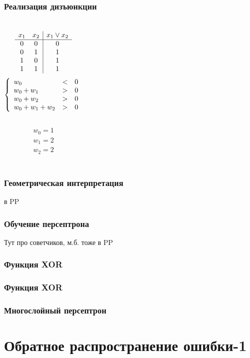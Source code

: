 \documentclass[24pt,pdf,hyperref={unicode}]{beamer}
\begin{document}
\begin{frame}\frametitle{Реализация дизъюнкции}
\begin{columns}
$$
\begin{array}{c c | c}
x_1 & x_2 & x_1\vee x_2 \\
\hline
0 & 0 & 0 \\
0 & 1 & 1 \\
1 & 0 & 1 \\
1 & 1 & 1 \\
\end{array}
$$
$$
\left\{
\begin{array}{l l l l l l}
 w_0       & < & 0 \\
 w_0 + w_1 & > & 0 \\
 w_0 + w_2 & > & 0 \\
 w_0 + w_1 + w_2 & > & 0 \\
\end{array}
\right.
$$\\[1cm]
$$
\begin{array}{l}
 w_0 = 1 \\
 w_1 = 2 \\
 w_2 = 2 \\
\end{array}
$$
\end{columns}
\end{frame}

\begin{frame}\frametitle{Геометрическая интерпретация}
в PP
\end{frame}

\begin{frame}\frametitle{Обучение персептрона}
Тут про советчиков, м.б. тоже в PP
\end{frame}

\begin{frametitle}\frametitle{Функция XOR}
 
\end{frametitle}

\begin{frametitle}\frametitle{Функция XOR}
 
\end{frametitle}

\begin{frametitle}\frametitle{Многослойный персептрон}
 
\end{frametitle}




\section{Обратное распространение ошибки-1}
\end{document}
